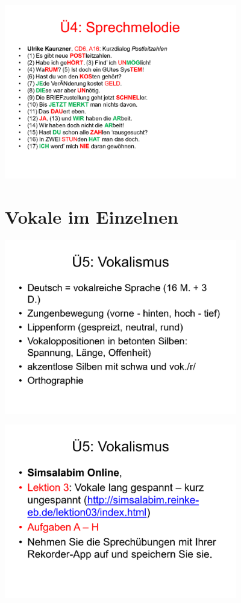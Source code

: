 \documentclass[
  letterpaper,
]{scrbook}
\begin{document}
\includegraphics[width=4in,height=\textheight]{./pictures/sprachlabor/Phonetikuebungen_S01_Page16.png}

\hypertarget{sec-vokale}{%
\chapter{Vokale im Einzelnen}\label{sec-vokale}}

\includegraphics[width=4in,height=\textheight]{./pictures/sprachlabor/Phonetikuebungen_S01_Page17.png}

\includegraphics[width=4in,height=\textheight]{./pictures/sprachlabor/Phonetikuebungen_S01_Page18.png}
\end{document}

